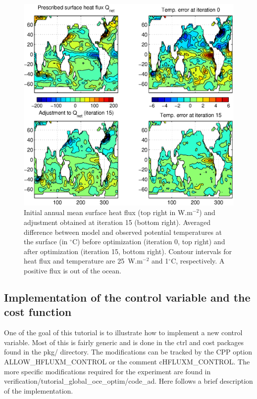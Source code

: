 \begin{figure} [tpb]
\begin{center}
\includegraphics[width=\textwidth,height=.3\textheight]{s_examples/global_oce_optim/Tutorial_fig.eps}
\caption{Initial annual mean surface heat flux (top right in W.m$^{-2}$) and 
adjustment obtained at iteration 15 (bottom right). Averaged difference
between model and observed potential temperatures at the surface (in $^\circ$C) 
before optimization (iteration 0, top right) and after optimization
(iteration 15, bottom right). Contour intervals for heat flux and temperature
are 25~W.m$^{-2}$ and 1$^\circ$C, respectively. A positive flux is out of the
ocean.}
\label{Results}
\end{center}
\end{figure}

\subsection{Implementation of the control variable and the cost function}

One of the goal of this tutorial is to illustrate how to implement a new
control variable. Most of this is fairly generic and is done in the ctrl
and cost packages found in the pkg/ directory. The modifications can be
tracked by the CPP option ALLOW\_HFLUXM\_CONTROL or the comment
cHFLUXM\_CONTROL. The more specific modifications required for the experiment
are found in verification/tutorial\_global\_oce\_optim/code\_ad. Here follows
a brief description of the implementation.


